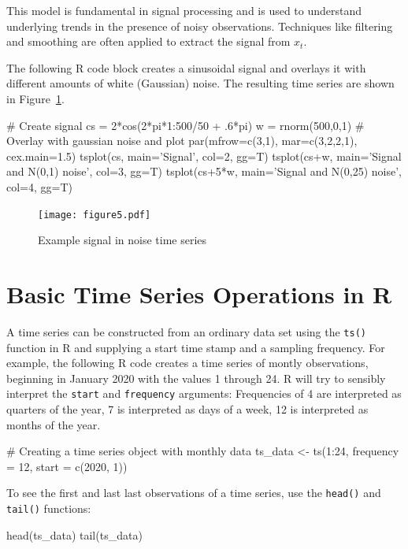 This model is fundamental in signal processing and is used to understand underlying trends in the presence of noisy observations. Techniques like filtering and smoothing are often applied to extract the signal from $x_t$.

The following R code block creates a sinusoidal signal and overlays it with different amounts of white (Gaussian) noise. The resulting time series are shown in Figure~\ref{fig:figure5}.

\begin{Rcode}
# Create signal
cs = 2*cos(2*pi*1:500/50 + .6*pi)
w = rnorm(500,0,1)
# Overlay with gaussian noise and plot
par(mfrow=c(3,1), mar=c(3,2,2,1), cex.main=1.5)
tsplot(cs, main='Signal', col=2, gg=T)
tsplot(cs+w, main='Signal and N(0,1) noise', col=3, gg=T)
tsplot(cs+5*w, main='Signal and N(0,25) noise', col=4, gg=T)
\end{Rcode}

\begin{figure}
\centering
\texttt{[image: figure5.pdf]}
\caption{Example signal in noise time series}
\label{fig:figure5}
\end{figure}

\section{Basic Time Series Operations in R}

A time series can be constructed from an ordinary data set using the \texttt{ts()} function in R and supplying a start time stamp and a sampling frequency. For example, the following R code creates a time series of montly observations, beginning in January 2020 with the values 1 through 24. R will try to sensibly interpret the \texttt{start} and \texttt{frequency} arguments: Frequencies of 4 are interpreted as quarters of the year, 7 is interpreted as days of a week, 12 is interpreted as months of the year.

\begin{samepage}
\begin{Rcode}
# Creating a time series object with monthly data
ts_data <- ts(1:24, frequency = 12, start = c(2020, 1))
\end{Rcode}
\end{samepage}

\noindent To see the first and last last observations of a time series, use the \texttt{head()} and \texttt{tail()} functions:

\begin{samepage}
\begin{Rcode}
head(ts_data)
tail(ts_data)
\end{Rcode}
\end{samepage}

